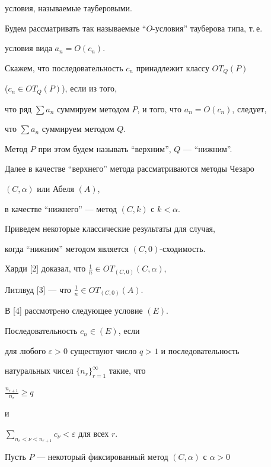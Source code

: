 условия, называемые тауберовыми.





Будем рассматривать так называемые ``$O$-условия'' тауберова типа, т.\,е.


условия вида $a_n=O (c_n)$.





Скажем, что последовательность ${c_n}$ принадлежит классу $OT_Q (P)$


(${c_n} \in OT_Q (P)$), если из того,


что ряд $\sum a_n$ суммируем методом $P$, и того, что $a_n=O(c_n)$, следует, 


что $\sum a_n$ суммируем методом $Q$.


Метод $P$ при этом будем называть ``верхним'', $Q$ --- ``нижним''.


Далее в качестве ``верхнего'' метода рассматриваются методы Чезаро


$(C, \alpha)$ или Абеля $(A)$,


в качестве ``нижнего'' --- метод $(C,k)$ с $k<\alpha$.





Приведем некоторые классические результаты для случая, 


когда ``нижним'' методом является $(C, 0)$-сходимость.





Харди [2] доказал, что $\frac{1}{n} \in OT_{(C, 0)} (C, \alpha)$, 


Литлвуд [3] --- что $\frac{1}{n} \in OT_{(C, 0)} (A)$. 


 


В [4] рассмотрeно следующее условие $(E)$. 


Последовательность ${c_n} \in (E)$, если


для любого $\varepsilon>0$ существуют число $q>1$ и последовательность 


натуральных чисел $\{n_r\}_{r=1}^{\infty}$ такие, что


$\frac{n_{r+1}}{n_r} \ge q$


и 


$\sum\limits_{n_r<\nu<n_{r+1}} c_{\nu}<\varepsilon$ для всех $r$.





Пусть $P$ --- некоторый фиксированный метод $(C, \alpha)$ с $\alpha>0$ 


